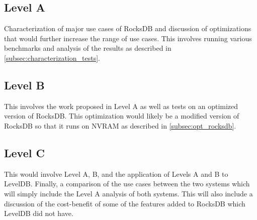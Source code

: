 \documentclass{article}
\begin{document}
\subsection{Level A}

Characterization of major use cases of RocksDB and discussion of optimizations
that would further increase the range of use cases. This involves running
various benchmarks and analysis of the results as described in
\ref{subsec:characterization_tests}.

\subsection{Level B}

This involves the work proposed in Level A as well as tests on an optimized
version of RocksDB. This optimization would likely be a modified version of
RocksDB so that it runs on NVRAM as described in \ref{subsec:opt_rocksdb}.

\subsection{Level C}

This would involve Level A, B, and the application of Levels A and B to LevelDB.
Finally, a comparison of the use cases between the two systems which will simply
include the Level A analysis of both systems. This will also include a
discussion of the cost-benefit of some of the features added to RocksDB which
LevelDB did not have.
\end{document}
